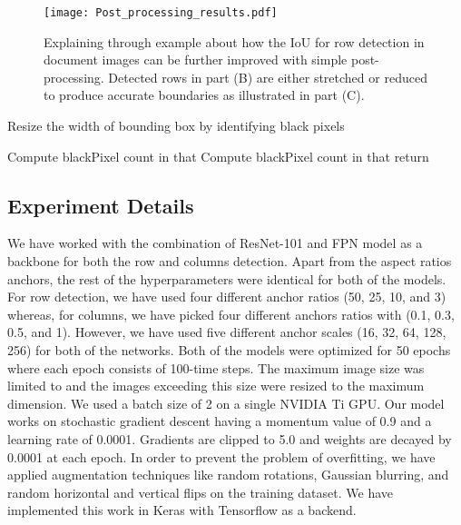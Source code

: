 \documentclass{ieeeaccess}
\begin{document}
\begin{figure*}[ht]
    \texttt{[image: Post\_processing\_results.pdf]}
    \caption{Explaining through example about how the IoU for row detection in document images can be further improved with simple post-processing. Detected rows in part (B) are either stretched or reduced to produce accurate boundaries as illustrated in part (C).}
    \label{fig:post_processing_results}
\end{figure*}

\renewcommand{\algorithmicrequire}{\textbf{Input: }\textit{I}: 2d array of predicted bounding box}
\renewcommand{\algorithmicensure}{\textbf{Output: }\textit{R}: Improved bounding box}


\begin{algorithm}

  \caption{Resize the width of bounding box by identifying black pixels}
  \begin{algorithmic}[1]
    \REQUIRE 
    \ENSURE
     \STATE 
     \STATE 
\STATE 
      
       
\IF{}
            \STATE Compute blackPixel count in that 
            \IF{}
                \STATE 
            \ENDIF
        \ENDIF
      \ENDFOR
        
        \IF{}
            \STATE Compute blackPixel count in that 
            \IF{}
                \STATE 
            \ENDIF
        \ENDIF
      \ENDFOR
    \STATE return 
  \end{algorithmic}
\label{algo}
\end{algorithm}




\subsection{Experiment Details}


We have worked with the combination of ResNet-101 \cite{b49} and FPN\cite{b50} model as a backbone for both the row and columns detection. Apart from the aspect ratios anchors, the rest of the hyperparameters were identical for both of the models. For row detection, we have used four different anchor ratios (50, 25, 10, and 3) whereas, for columns, we have picked four different anchors ratios with (0.1, 0.3, 0.5, and 1). However, we have used five different anchor scales (16, 32, 64, 128, 256) for both of the networks. Both of the models were optimized for 50 epochs where each epoch consists of 100-time steps. The maximum image size was limited to  and the images exceeding this size were resized to the maximum dimension. We used a batch size of 2 on a single NVIDIA  Ti GPU. Our model works on stochastic gradient descent having a momentum value of 0.9 and a learning rate of 0.0001. Gradients are clipped to 5.0 and weights are decayed by 0.0001 at each epoch. In order to prevent the problem of overfitting, we have applied augmentation techniques like random rotations, Gaussian blurring, and random horizontal and vertical flips on the training dataset. We have implemented this work in Keras \cite{b53} with Tensorflow \cite{b54} as a backend.
\end{document}
